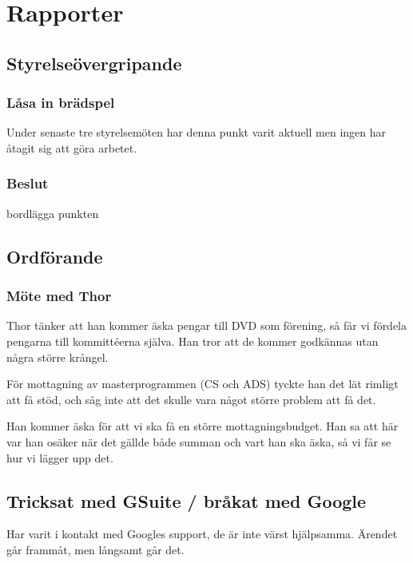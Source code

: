 \documentclass[protokoll]{dvd}
\begin{document}
\newpage


\section{Rapporter}


\subsection{Styrelseövergripande}

\subsubsection*{Låsa in brädspel}

Under senaste tre styrelsemöten har denna punkt varit aktuell men ingen har åtagit sig att göra arbetet. 

\subsubsection*{Beslut}
\begin{attsatser}
    \item bordlägga punkten 
\end{attsatser}


\newpage



\subsection{Ordförande}

\subsubsection*{Möte med Thor}
    Thor tänker att han kommer äska pengar till DVD som förening, så får vi fördela pengarna till kommittéerna själva. Han tror att de kommer godkännas utan några större krångel.

    För mottagning av masterprogrammen (CS och ADS) tyckte han det lät rimligt att få stöd, och såg inte att det skulle vara något större problem att få det.

    Han kommer äska för att vi ska få en större mottagningsbudget. Han sa att här var han osäker när det gällde både summan och vart han ska äska, så vi får se hur vi lägger upp det.

\subsection*{Tricksat med GSuite / bråkat med Google}
    Har varit i kontakt med Googles support, de är inte värst hjälpsamma.
    Ärendet går frammåt, men långsamt går det.
\end{document}
